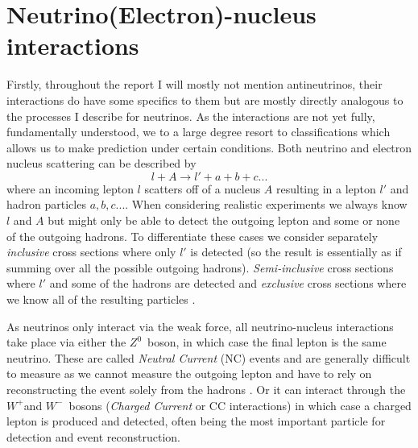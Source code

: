 \documentclass[a4paper,12pt]{article}
\newcommand{\Zz}{$Z^0$}
\newcommand{\Wp}{$W^+$}
\newcommand{\Wm}{$W^-$}
\begin{document}


\section{Neutrino(Electron)-nucleus interactions}
Firstly, throughout the report I will mostly not mention antineutrinos, their interactions do have some specifics to them but are mostly directly analogous to the processes I describe for neutrinos.
As the interactions are not yet fully, fundamentally understood, we to a large degree resort to classifications which allows us to make prediction under certain conditions.
Both neutrino and electron nucleus scattering can be described by
\begin{equation}\label{eq:genint}
    l + A \rightarrow l' + a + b + c ...
\end{equation}
where an incoming lepton $l$ scatters off of a nucleus $A$ resulting in a lepton $l'$ and hadron particles $a, b, c ...$.
When considering realistic experiments we always know $l$ and $A$ but might only be able to detect the outgoing lepton and some or none of the outgoing hadrons. 
To differentiate these cases we consider separately \emph{inclusive} cross sections where only $l'$ is detected (so the result is essentially as if summing over all the possible outgoing hadrons).
\emph{Semi-inclusive} cross sections where $l'$ and some of the hadrons are detected and \emph{exclusive} cross sections where we know all of the resulting particles \cite{amaroElectronNeutrinonucleusScattering2020}.

As neutrinos only interact via the weak force, all neutrino-nucleus interactions take place via either the \Zz\ boson, in which case the final lepton is the same neutrino.
These are called \emph{Neutral Current} (NC) events and are generally difficult to measure as we cannot measure the outgoing lepton and have to rely on reconstructing the event solely from the hadrons \cite{giustiNeutralCurrentNeutrinonucleus2020}.
Or it can interact through the \Wp and \Wm\ bosons (\emph{Charged Current} or CC interactions) in which case a charged lepton is produced and detected, often being the most important particle for detection and event reconstruction.
\end{document}
